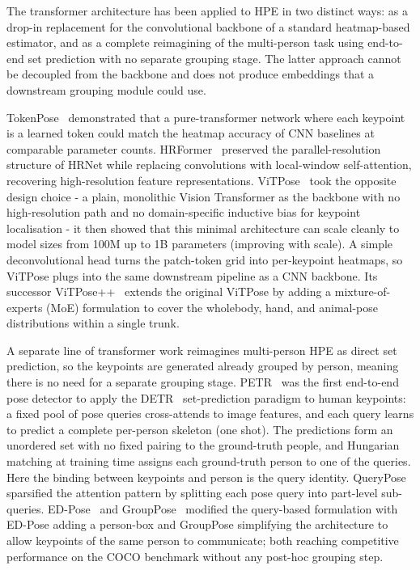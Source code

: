 The transformer architecture has been applied to HPE in two distinct ways:
as a drop-in replacement for the convolutional backbone of a standard heatmap-based estimator,
and as a complete reimagining of the multi-person task
using end-to-end set prediction with no separate grouping stage.
The latter approach cannot be decoupled from the backbone
and does not produce embeddings that a downstream grouping module could use.

TokenPose~\cite{li2021tokenpose} demonstrated that a pure-transformer
network where each keypoint is a learned token could match the
heatmap accuracy of CNN baselines at comparable parameter counts.
HRFormer~\cite{yuan2021hrformer} preserved the parallel-resolution
structure of HRNet while replacing convolutions with local-window
self-attention, recovering high-resolution feature representations.
ViTPose~\cite{xu2022vitpose} took the opposite design choice -
a plain, monolithic Vision Transformer as the backbone with no
high-resolution path and no domain-specific inductive bias for
keypoint localisation -
it then showed that this minimal architecture can scale cleanly
to model sizes from 100M up to 1B parameters (improving with scale).
A simple deconvolutional head turns the patch-token grid into
per-keypoint heatmaps, so ViTPose plugs into the same downstream pipeline as a CNN backbone.
Its successor ViTPose++~\cite{xu2023vitposepp} extends the original ViTPose by adding a
mixture-of-experts (MoE) formulation to cover the wholebody, hand, and
animal-pose distributions within a single trunk.

A separate line of transformer work reimagines multi-person HPE as direct set prediction,
so the keypoints are generated already grouped by person,
meaning there is no need for a separate grouping stage.
PETR~\cite{shi2022petr} was the first end-to-end pose detector to
apply the DETR~\cite{carion2020detr} set-prediction paradigm to human keypoints:
a fixed pool of pose queries cross-attends to image features,
and each query learns to predict a complete per-person skeleton (one shot).
The predictions form an unordered set with no fixed pairing to the ground-truth people,
and Hungarian matching at training time assigns each ground-truth person to one of the queries.
Here the binding between keypoints and person is the query identity.
QueryPose~\cite{xiao2022querypose} sparsified the attention pattern by
splitting each pose query into part-level sub-queries.
ED-Pose~\cite{yang2023edpose} and GroupPose~\cite{liu2023grouppose}
modified the query-based formulation with ED-Pose adding a person-box
and GroupPose simplifying the architecture to allow keypoints of the same person to communicate;
both reaching competitive performance on the COCO benchmark without any
post-hoc grouping step.

